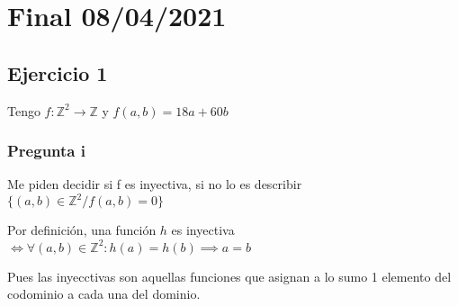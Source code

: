 
\usepackage{caratula}
\usepackage{enumerate}
\usepackage{hyperref}
\usepackage{graphicx}
\usepackage{amsfonts}
\usepackage{enumitem}
\usepackage{amsmath}

\decimalpoint
\hypersetup{colorlinks=true, linkcolor=black, urlcolor=blue}
\setlength{\parindent}{0em}
\setlength{\parskip}{0.5em}
\setcounter{tocdepth}{3} %
\setcounter{section}{0} %
\renewcommand{\thesubsubsection}{\thesubsection.\Alph{subsubsection}}
\graphicspath{ {images/} }





\maketitle
\newpage

\tableofcontents
\newpage

\section{Final 08/04/2021}

\subsection{Ejercicio 1}

Tengo $ f: \mathbb{Z}^2 \rightarrow \mathbb{Z} $ y $ f(a,b) = 18a+60b $

\subsubsection{Pregunta i}

Me piden decidir si f es inyectiva, si no lo es describir $ \{ (a,b) \in \mathbb{Z}^2 / f(a,b) = 0 \} $

Por definición, una función $h$ es inyectiva $ \iff \forall (a,b) \in \mathbb{Z}^2: h(a) = h(b) \implies a = b $

Pues las inyecctivas son aquellas funciones que asignan a lo sumo 1 elemento del codominio a cada una del dominio.

